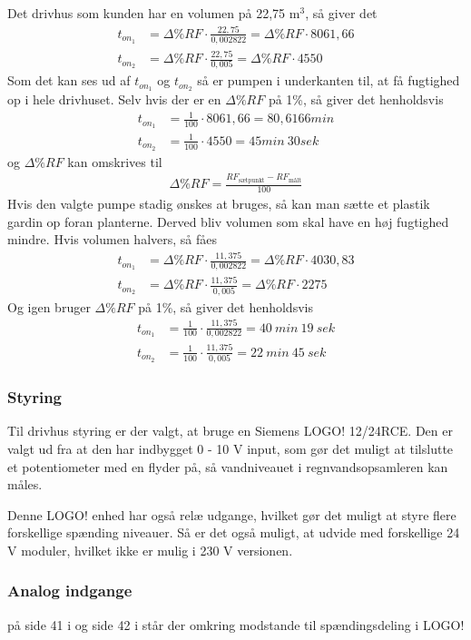 Det drivhus som kunden har en volumen på 22,75 m$^3$, så giver det
\begin{align}
    t_{on_{1}} & = \Delta\%RF\cdot\frac{ 22,75 }{0,002822} = \Delta\%RF\cdot8061,66 \\
    t_{on_{2}} & = \Delta\%RF\cdot\frac{ 22,75 }{0,005} = \Delta\%RF\cdot4550 
\end{align}
Som det kan ses ud af $t_{on_{1}}$ og $t_{on_{2}}$ så er pumpen i underkanten til, at få fugtighed op i hele drivhuset.
Selv hvis der er en $\Delta\%RF$ på 1\%, så giver det henholdsvis
\begin{align}
    t_{on_{1}} &= \frac{1}{100} \cdot 8061,66 = 80,6166 min \\
    t_{on_{2}} &= \frac{1}{100} \cdot 4550 = 45 min \ 30 sek
\end{align}
og $\Delta\%RF$ kan omskrives til 
\begin{align}
    \Delta\%RF = \frac{ RF_{\text{sætpunkt}} - RF_{\text{målt}} }{ 100 }
\end{align}
Hvis den valgte pumpe stadig ønskes at bruges, så kan man sætte et plastik gardin op foran planterne.
Derved bliv volumen som skal have en høj fugtighed mindre. Hvis volumen halvers, så fåes
\begin{align}
    t_{on_{1}} & = \Delta\%RF\cdot\frac{ 11,375 }{0,002822} = \Delta\%RF\cdot4030,83 \\
    t_{on_{2}} & = \Delta\%RF\cdot\frac{ 11,375 }{0,005} = \Delta\%RF\cdot2275 
\end{align}
Og igen bruger $\Delta\%RF$ på 1\%, så giver det henholdsvis
\begin{align}
    t_{on_{1}} & = \frac{1}{100}\cdot\frac{ 11,375 }{0,002822} = 40 \ min \ 19 \ sek\\
    t_{on_{2}} & = \frac{1}{100}\cdot\frac{ 11,375 }{0,005} = 22 \ min \ 45 \ sek
\end{align}

\subsubsection{Styring}
Til drivhus styring er der valgt, at bruge en Siemens LOGO! 12/24RCE. 
Den er valgt ud fra at den har indbygget 0 - 10 V input, 
som gør det muligt at tilslutte et potentiometer med en flyder på, 
så vandniveauet i regnvandsopsamleren kan måles.

Denne LOGO! enhed har også relæ udgange, 
hvilket gør det muligt at styre flere forskellige spænding niveauer.
Så er det også muligt, at udvide med forskellige 24 V moduler, hvilket ikke er mulig i 230 V versionen.

\subsubsection{Analog indgange}
på side 41 i \cite{logo_sm} og side 42 i \cite{logo_sm} står der omkring modstande til spændingsdeling i LOGO!
